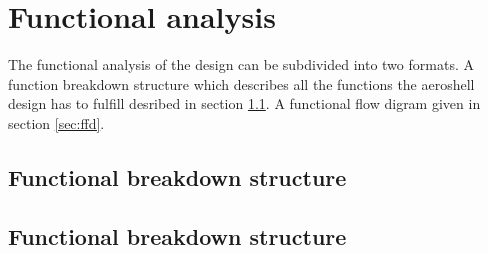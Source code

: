 \section{Functional analysis}\label{ch:func}

The functional analysis of the design can be subdivided into two formats. A function breakdown structure which describes all the functions the aeroshell design has to fulfill desribed in section \ref{sec:fbs}. A functional flow digram given in section \ref{sec:ffd}.

\subsection{Functional breakdown structure} \label{sec:fbs}



\subsection{Functional breakdown structure} \label{sec:ffs}